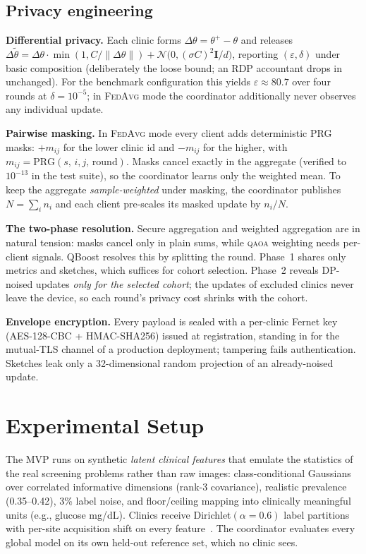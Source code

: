 \documentclass[conference]{IEEEtran}
\newcommand{\qaoa}{\textsc{qaoa}}
\newcommand{\fedavg}{\textsc{FedAvg}}
\begin{document}
\subsection{Privacy engineering}\label{sec:privacy}
\textbf{Differential privacy.} Each clinic forms $\Delta\theta =
\theta^{+}-\theta$ and releases
$\Delta\tilde\theta=\Delta\theta\cdot\min(1,C/\|\Delta\theta\|)+\mathcal{N}\!\bigl(0,(\sigma C)^2\mathbf{I}/d\bigr)$,
reporting $(\varepsilon,\delta)$ under basic composition (deliberately the
loose bound; an RDP accountant drops in unchanged). For the benchmark
configuration this yields $\varepsilon\!\approx\!80.7$ over four rounds at
$\delta{=}10^{-5}$; in \fedavg{} mode the coordinator additionally never
observes any individual update.

\textbf{Pairwise masking.} In \fedavg{} mode every client adds
deterministic PRG masks: $+m_{ij}$ for the lower clinic id and $-m_{ij}$ for
the higher, with $m_{ij}=\mathrm{PRG}(s,\,i,j,\,\text{round})$. Masks cancel
exactly in the aggregate (verified to $10^{-13}$ in the test suite), so the
coordinator learns only the weighted mean. To keep the aggregate
\emph{sample-weighted} under masking, the coordinator publishes
$N=\sum_i n_i$ and each client pre-scales its masked update by $n_i/N$.

\textbf{The two-phase resolution.} Secure aggregation and weighted aggregation
are in natural tension: masks cancel only in plain sums, while \qaoa{}
weighting needs per-client signals. QBoost resolves this by splitting the
round. Phase~1 shares only metrics and sketches, which suffices for cohort
selection. Phase~2 reveals DP-noised updates \emph{only for the selected
cohort}; the updates of excluded clinics never leave the device, so each
round's privacy cost shrinks with the cohort.

\textbf{Envelope encryption.} Every payload is sealed with a per-clinic
Fernet key (AES-128-CBC + HMAC-SHA256) issued at registration, standing in
for the mutual-TLS channel of a production deployment; tampering fails
authentication. Sketches leak only a 32-dimensional random projection of an
already-noised update.

\section{Experimental Setup}
The MVP runs on synthetic \emph{latent clinical features} that emulate the
statistics of the real screening problems rather than raw images:
class-conditional Gaussians over correlated informative dimensions (rank-3
covariance), realistic prevalence (0.35--0.42), 3\% label noise, and
floor/ceiling mapping into clinically meaningful units (e.g., glucose mg/dL).
Clinics receive Dirichlet$(\alpha{=}0.6)$ label partitions with per-site
acquisition shift on every feature~\cite{hsu}. The coordinator evaluates
every global model on its own held-out reference set, which no clinic sees.
\end{document}
